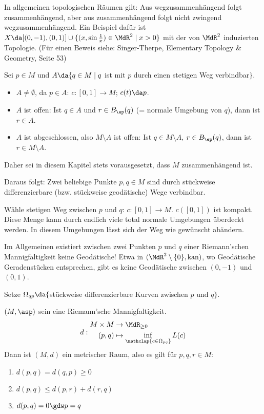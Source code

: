 \documentclass[a4paper,twoside,DIV15,BCOR12mm]{scrbook}
\newcommand{\kan}{\text{kan}}
\begin{document}
\begin{bemerkung}
In allgemeinen topologischen Räumen gilt: Aus wegzusammenhängend folgt zusammenhängend, aber aus zusammenhängend folgt nicht zwingend wegzusammenhängend. Ein Beispiel dafür ist $X\da [(0,-1),(0,1)] \cup \{(x,\sin \frac1x)\in\MdR^2\mid x>0\}$ mit der von $\MdR^2$ induzierten Topologie. (Für einen Beweis siehe: Singer-Therpe, Elementary Topology \& Geometry, Seite 53)
\end{bemerkung}

\begin{beweis}
Sei $p\in M$ und $A\da \{q \in M\mid q$ ist mit $p$ durch einen stetigen Weg verbindbar$\}$.
\begin{itemize}
\item  $A\ne \emptyset$, da $p\in A$: $c:[0,1] \to M$; $c(t)\da p$.
\item  $A$ ist offen: Ist $q\in A$ und $r\in B_\ep(q)$ (= normale Umgebung von $q$), dann ist $r \in A$.
\item $A$ ist abgeschlossen, also $M\setminus A$ ist offen: Ist $q\in M \setminus A$, $r\in B_\ep(q)$, dann ist $r\in M\setminus A$.
\end{itemize}
\end{beweis}

Daher sei in diesem Kapitel stets vorausgesetzt, dass $M$ zusammenhängend ist. 

Daraus folgt: Zwei beliebige Punkte $p,q\in M$ sind durch stückweise differenzierbare (bzw. stückweise geodätische) Wege verbindbar.

\begin{beweis}
Wähle stetigen Weg zwischen $p$ und $q$: $c:[0,1]\to M$. $c([0,1])$ ist kompakt. Diese Menge kann durch endlich viele total normale Umgebungen überdeckt werden. In  diesem Umgebungen lässt sich der Weg wie gewünscht abändern.
\end{beweis}

\begin{bemerkung}
Im Allgemeinen existiert zwischen zwei Punkten $p$ und $q$ einer Riemann’schen Mannigfaltigkeit keine Geodätische! Etwa in $(\MdR^2\setminus\{0\},\kan)$, wo Geodätische Geradenstücken entsprechen, gibt es keine Geodätische zwischen $(0,-1)$ und $(0,1)$.
\end{bemerkung}

Setze $\Omega_{qp}\da \{$stückweise differenzierbare Kurven zwischen $p$ und $q\}$.

\begin{satz}[Längenmetrik]
$(M,\asp)$ sein eine Riemann’sche Mannigfaltigkeit. 
\[
d : 
\begin{aligned}
M \times M &\to \MdR_{\ge 0} \\
(p,q) &\mapsto \inf_{\mathclap{c\in \Omega_{pq}}} L(c)
\end{aligned}
\]
Dann ist $(M,d)$ ein metrischer Raum, also es gilt für $p,q,r\in M$: 
\begin{enumerate}
\item $d(p,q) = d(q,p) \ge 0$
\item $d(p,q) \le d(p,r) + d(r,q)$
\item $d(p,q) = 0 \gdw p = q$
\end{enumerate}
\end{satz}
\end{document}
